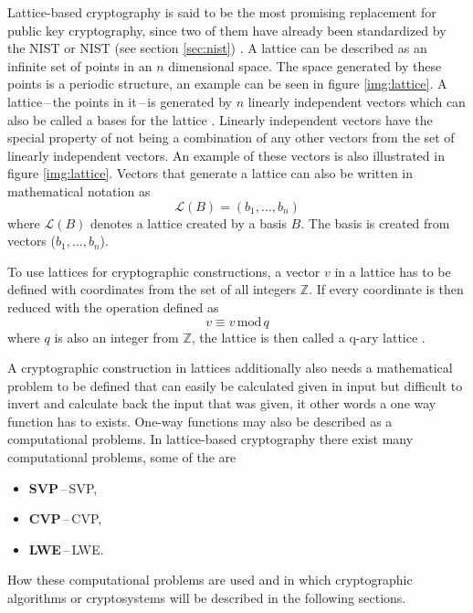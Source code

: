 Lattice-based cryptography is said to be the most promising replacement for public key cryptography, since two of them have already been standardized by the \acl{NIST} or NIST (see section \ref{sec:nist}) \cite{Alagic2022}. A lattice can be described as an infinite set of points in an $n$ dimensional space. The space generated by these points is a periodic structure, an example can be seen in figure \ref{img:lattice}. A lattice\,--\,the points in it\,--\,is generated by $n$ linearly independent vectors which can also be called a bases for the lattice \cite{Ajati1996}. Linearly independent vectors have the special property of not being a combination of any other vectors from the set of linearly independent vectors. An example of these vectors is also illustrated in figure \ref{img:lattice}. Vectors that generate a lattice can also be written in mathematical notation as
\begin{equation}
  \mathcal{L}(B)=(b_1,\dots,b_n)
\end{equation}
where $\mathcal{L}(B)$ denotes a lattice created by a basis $B$. The basis is created from vectors ($b_1,\dots,b_n$).


To use lattices for cryptographic constructions, a vector $v$ in a lattice has to be defined with coordinates from the set of all integers $\mathbb{Z}$. If every coordinate is then reduced with the operation defined as
\begin{equation}
  v\equiv v\,\mathrm{mod}\,q
\end{equation}
where $q$ is also an integer from $\mathbb{Z}$, the lattice is then called a q-ary lattice \cite{Bernstein2009}.

A cryptographic construction in lattices additionally also needs a mathematical problem to be defined that can easily be calculated given in input but difficult to invert and calculate back the input that was given, it other words a one way function has to exists. One-way functions may also be described as a computational problems. In lattice-based cryptography there exist many computational problems, some of the are
\begin{itemize}
  \item \textbf{SVP}\,--\,\acl{SVP},
  \item \textbf{CVP}\,--\,\acl{CVP},
  \item \textbf{LWE}\,--\,\acl{LWE}\cite{Bernstein2009}.
\end{itemize}
How these computational problems are used and in which cryptographic algorithms or cryptosystems will be described in the following sections.

